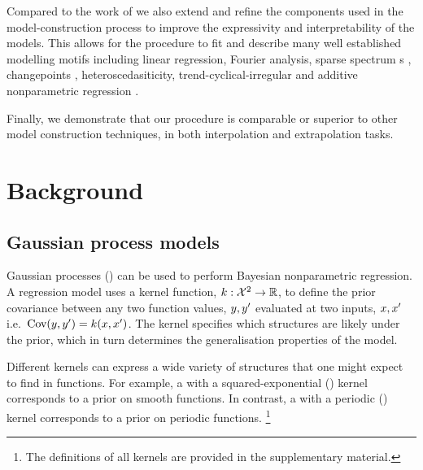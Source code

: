 \documentclass{article}
\def\ie{i.e.\ }
\begin{document}
Compared to the work of \cite{DuvLloGroetal13} we also extend and refine the components used in the model-construction process to improve the expressivity and interpretability of the models.
This allows for the procedure to fit and describe many well established modelling motifs including linear regression, Fourier analysis, sparse spectrum \gp{}s \citep{lazaro2010sparse}, changepoints \citep[e.g.][]{garnett2010sequential, FoxDunson:NIPS2012}, heteroscedasiticity, trend-cyclical-irregular \citep[e.g.][]{lind2006basic} and additive nonparametric regression \citep[e.g.][]{buja1989linear}.

Finally, we demonstrate that our procedure is comparable or superior to other model construction techniques, in both interpolation and extrapolation tasks.

\section{Background}
\label{sec:gpss}

\subsection{Gaussian process models}

Gaussian processes (\gp{}) \citep{rasmussen38gaussian} can be used to perform Bayesian nonparametric regression.
A \gp{} regression model uses a kernel function, ${k : \mathcal{X}^2 \to \mathbb{R}}$, to define the prior covariance between any two function values, $y, y'$ evaluated at two inputs, $x,x'$ \ie ${\textrm{Cov}(y, y') = k(x,x')}$.
The kernel specifies which structures are likely under the \gp{} prior, which in turn determines the generalisation properties of the model.

Different kernels can express a wide variety of structures that one might expect to find in functions.
For example, a \gp{} with a squared-exponential (\kSE) kernel corresponds to a prior on smooth functions.
In contrast, a \gp{} with a periodic (\kPer) kernel corresponds to a prior on periodic functions.
\footnote{The definitions of all kernels are provided in the supplementary material.}
\end{document}
